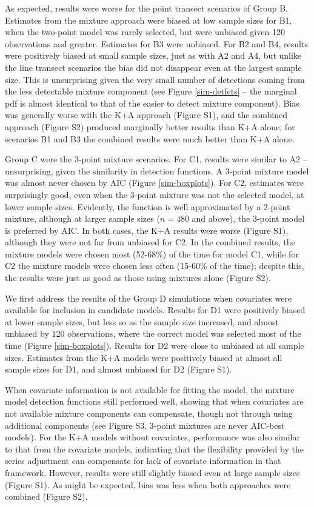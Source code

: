 \documentclass[10pt]{article}
\begin{document}
As expected, results were worse for the point transect scenarios of Group B. Estimates from the mixture approach were biased at low sample sizes for B1, when the two-point model was rarely selected, but were unbiased given 120 observations and greater. Estimates for B3 were unbiased.  For B2 and B4, results were positively biased at small sample sizes, just as with A2 and A4, but unlike the line transect scenarios the bias did not disappear even at the largest sample size. This is unsurprising given the very small number of detections coming from the less detectable mixture component (see Figure \ref{sim-detfcts} -- the marginal pdf is almost identical to that of the easier to detect mixture component). Bias was generally worse with the K+A approach (Figure S1), and the combined approach (Figure S2) produced marginally better results than K+A alone; for scenarios B1 and B3 the combined results were much better than K+A alone. 

Group C were the 3-point mixture scenarios.  For C1, results were similar to A2 -- unsurprising, given the similarity in detection functions.  A 3-point mixture model was almost never chosen by AIC (Figure \ref{sim-boxplots}).  For C2, estimates were surprisingly good, even when the 3-point mixture was not the selected model, at lower sample sizes.  Evidently, the function is well approximated by a 2-point mixture, although at larger sample sizes ($n=480$ and above), the 3-point model is preferred by AIC. In both cases, the K+A results were worse (Figure S1), although they were not far from unbiased for C2.  In the combined results, the mixture models were chosen most (52-68\%) of the time for model C1, while for C2 the mixture models were chosen less often (15-60\% of the time); despite this, the results were just as good as those using mixtures alone (Figure S2).

We first address the results of the Group D simulations when covariates were available for inclusion in candidate models. Results for D1 were positively biased at lower sample sizes, but less so as the sample size increased, and almost unbiased by 120 observations, where the correct model was selected most of the time (Figure \ref{sim-boxplots}).  Results for D2 were close to unbiased at all sample sizes. Estimates from the K+A models were positively biased at almost all sample sizes for D1, and almost unbiased for D2 (Figure S1).

When covariate information is not available for fitting the model, the mixture model detection functions still performed well, showing that when covariates are not available mixture components can compensate, though not through using additional components (see Figure S3, 3-point mixtures are never AIC-best models).  For the K+A models without covariates, performance was also similar to that from the covariate models, indicating that the flexibility provided by the series adjustment can compensate for lack of covariate information in that framework.  However, results were still slightly biased even at large sample sizes (Figure S1).  As might be expected, bias was less when both approaches were combined (Figure S2).
\end{document}
